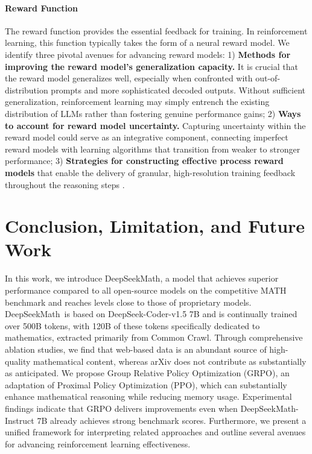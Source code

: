 \begin{itemize}[topsep=0pt]
\begin{itemize}[topsep=0pt]
\paragraph{Reward Function} The reward function provides the essential feedback for training. In reinforcement learning, this function typically takes the form of a neural reward model. We identify three pivotal avenues for advancing reward models: 1) \textbf{Methods for improving the reward model’s generalization capacity.} It is crucial that the reward model generalizes well, especially when confronted with out-of-distribution prompts and more sophisticated decoded outputs. Without sufficient generalization, reinforcement learning may simply entrench the existing distribution of LLMs rather than fostering genuine performance gains; 2) \textbf{Ways to account for reward model uncertainty.} Capturing uncertainty within the reward model could serve as an integrative component, connecting imperfect reward models with learning algorithms that transition from weaker to stronger performance; 3) \textbf{Strategies for constructing effective process reward models} that enable the delivery of granular, high-resolution training feedback throughout the reasoning steps \citep{lightman2023let,wang2023math}.

\section{Conclusion, Limitation, and Future Work}

In this work, we introduce DeepSeekMath, a model that achieves superior performance compared to all open-source models on the competitive MATH benchmark and reaches levels close to those of proprietary models. DeepSeekMath~is based on DeepSeek-Coder-v1.5 7B and is continually trained over 500B tokens, with 120B of these tokens specifically dedicated to mathematics, extracted primarily from Common Crawl. Through comprehensive ablation studies, we find that web-based data is an abundant source of high-quality mathematical content, whereas arXiv does not contribute as substantially as anticipated. We propose Group Relative Policy Optimization (GRPO), an adaptation of Proximal Policy Optimization (PPO), which can substantially enhance mathematical reasoning while reducing memory usage. Experimental findings indicate that GRPO delivers improvements even when DeepSeekMath-Instruct 7B already achieves strong benchmark scores. Furthermore, we present a unified framework for interpreting related approaches and outline several avenues for advancing reinforcement learning effectiveness.


\end{itemize}
\end{itemize}
